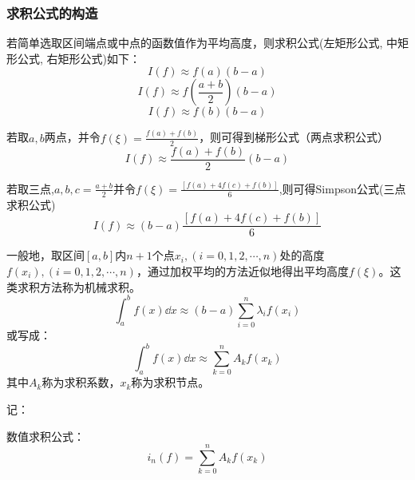 \subsubsection{求积公式的构造}

 若简单选取区间端点或中点的函数值作为平均高度，则求积公式(左矩形公式, 中矩形公式, 右矩形公式)如下：
    \begin{equation*}
        I(f)\approx f(a)(b-a)
    \end{equation*}
    \begin{equation*}
        I(f)\approx f(\frac{a+b}{2})(b-a)
    \end{equation*}
    \begin{equation*}
        I(f)\approx f(b)(b-a)
    \end{equation*}

\begin{definition}[两点求积公式]
    若取$a,b$两点，并令$f(\xi ) = \frac{f(a)+f(b)}{2}$，则可得到梯形公式（两点求积公式）
    \begin{equation*}
        I(f)\approx \frac{f(a)+f(b)}{2}(b-a)
    \end{equation*}
\end{definition}

\begin{definition}
    若取三点,$a,b,c = \frac{a+b}{2}$并令$f(\xi ) = \frac{[f(a)+4f(c)+f(b)]}{6}$,则可得Simpson公式(三点求积公式)
    \begin{equation*}
        I(f)\approx (b-a)\frac{[f(a)+4f(c)+f(b)]}{6}
    \end{equation*}  
\end{definition}

\begin{definition}[机械求积]
    一般地，取区间$[a,b]$内$n+1$个点${x_i},(i=0,1,2,\cdots,n)$处的高度${f(x_i)},(i=0,1,2,\cdots,n)$，通过加权平均的方法近似地得出平均高度$f(\xi )$。这类求积方法称为机械求积。
    \begin{equation*}
        \int_{a}^{b}f(x)\dd{x} \approx (b-a)\sum_{i=0}^{n}\lambda_if(x_i)
    \end{equation*}
    或写成：
    \begin{equation*}
        \int_{a}^{b}f(x)\dd{x} \approx \sum_{k=0}^{n}A_kf(x_k)
    \end{equation*}
    其中$A_k$称为求积系数，$x_k$称为求积节点。
\end{definition}

记：

数值求积公式：
\begin{equation*}
     i_n(f) = \sum_{k=0}^{n}A_kf(x_k)   
\end{equation*}

